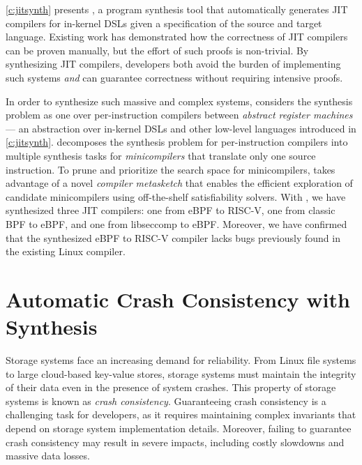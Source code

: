 \cref{c:jitsynth} presents \jitsynth, a program synthesis tool that
automatically generates JIT compilers for in-kernel DSLs
given a specification of the source and target language.
Existing work has demonstrated how the correctness of JIT compilers
can be proven manually\cite{wang:jitk,sobel:ejitk},
but the effort of such proofs is non-trivial.
By synthesizing JIT compilers, developers both avoid the burden of implementing
such systems \textit{and} can guarantee correctness
without requiring intensive proofs.

In order to synthesize such massive and complex systems,
\jitsynth considers the synthesis problem as one over per-instruction compilers
between \textit{abstract register machines} --- an abstraction over
in-kernel DSLs and other low-level languages introduced in \cref{c:jitsynth}.
\jitsynth decomposes the synthesis problem for per-instruction compilers
into multiple synthesis tasks for \textit{minicompilers}
that translate only one source instruction. %
To prune and prioritize the search space for minicompilers,
\jitsynth takes advantage of a novel \textit{compiler metasketch}
that enables the efficient exploration of candidate minicompilers
using off-the-shelf satisfiability solvers.
With \jitsynth, we have synthesized three JIT compilers:
one from eBPF to RISC-V,
one from classic BPF to eBPF,
and one from libseccomp to eBPF.
Moreover, we have confirmed that the synthesized eBPF to RISC-V compiler
lacks bugs previously found in the existing Linux compiler.

\section{Automatic Crash Consistency with Synthesis}
Storage systems face an increasing demand for reliability.
From Linux file systems to large cloud-based key-value stores,
storage systems must maintain the integrity of their data
even in the presence of system crashes.
This property of storage systems is known as \textit{crash consistency}.
Guaranteeing crash consistency is a challenging task for developers,
as it requires maintaining complex invariants that depend on
storage system implementation details.
Moreover, failing to guarantee crash consistency may result in severe impacts,
including costly slowdowns and massive data losses. %

